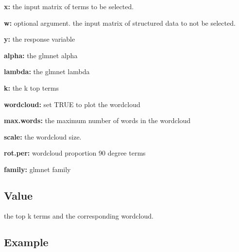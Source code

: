 \documentclass[]{article}
\begin{document}
\textbf{x:} the input matrix of terms to be selected.

\textbf{w:} optional argument. the input matrix of structured data to
not be selected.

\textbf{y:} the response variable

\textbf{alpha:} the glmnet alpha

\textbf{lambda:} the glmnet lambda

\textbf{k:} the k top terms

\textbf{wordcloud:} set TRUE to plot the wordcloud

\textbf{max.words:} the maximum number of words in the wordcloud

\textbf{scale:} the wordcloud size.

\textbf{rot.per:} wordcloud proportion 90 degree terms

\textbf{family:} glmnet family

\subsection{Value}\label{value-10}

the top k terms and the corresponding wordcloud.

\subsection{Example}\label{example-10}
\end{document}
